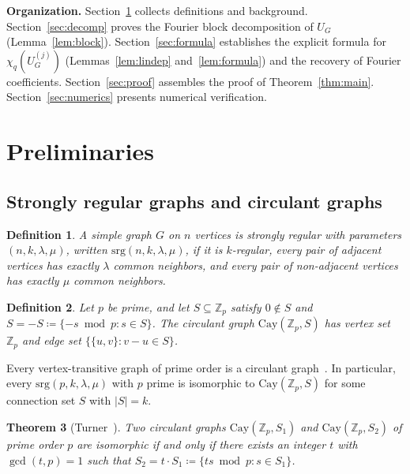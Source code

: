 \documentclass[12pt]{article}
\newtheorem{theorem}{Theorem}[section]
\newtheorem{definition}[theorem]{Definition}
\newcommand{\Z}{\mathbb{Z}}
\newcommand{\Cay}{\mathrm{Cay}}
\newcommand{\srg}{\mathrm{srg}}
\newcommand{\eqdef}{\coloneqq}
\newcommand{\Uj}{U_G^{(j)}}
\begin{document}
\medskip
\noindent\textbf{Organization.}
Section~\ref{sec:prelim} collects definitions and background.
Section~\ref{sec:decomp} proves the Fourier block decomposition of $U_G$
(Lemma~\ref{lem:block}).
Section~\ref{sec:formula} establishes the explicit formula for $\chi_q(\Uj)$
(Lemmas~\ref{lem:lindep} and~\ref{lem:formula}) and the recovery of Fourier
coefficients.
Section~\ref{sec:proof} assembles the proof of Theorem~\ref{thm:main}.
Section~\ref{sec:numerics} presents numerical verification.

\section{Preliminaries}
\label{sec:prelim}

\subsection{Strongly regular graphs and circulant graphs}

\begin{definition}
  A simple graph $G$ on $n$ vertices is \emph{strongly regular} with
  parameters $(n,k,\lambda,\mu)$, written $\srg(n,k,\lambda,\mu)$, if it
  is $k$-regular, every pair of adjacent vertices has exactly $\lambda$
  common neighbors, and every pair of non-adjacent vertices has exactly
  $\mu$ common neighbors.
\end{definition}

\begin{definition}
  Let $p$ be prime, and let $S \subseteq \Z_p$ satisfy $0 \notin S$ and
  $S = -S \eqdef \{-s \bmod p : s \in S\}$.  The \emph{circulant graph}
  $\Cay(\Z_p, S)$ has vertex set $\Z_p$ and edge set
  $\{\{u,v\} : v - u \in S\}$.
\end{definition}

Every vertex-transitive graph of prime order is a circulant
graph~\cite{Turner1967}.  In particular, every $\srg(p,k,\lambda,\mu)$
with $p$ prime is isomorphic to $\Cay(\Z_p,S)$ for some connection set $S$
with $|S|=k$.

\begin{theorem}[Turner~\cite{Turner1967}]\label{thm:turner}
  Two circulant graphs $\Cay(\Z_p, S_1)$ and $\Cay(\Z_p, S_2)$ of prime
  order $p$ are isomorphic if and only if there exists an integer $t$ with
  $\gcd(t,p) = 1$ such that
  $S_2 = t \cdot S_1 \eqdef \{ts \bmod p : s \in S_1\}$.
\end{theorem}
\end{document}
